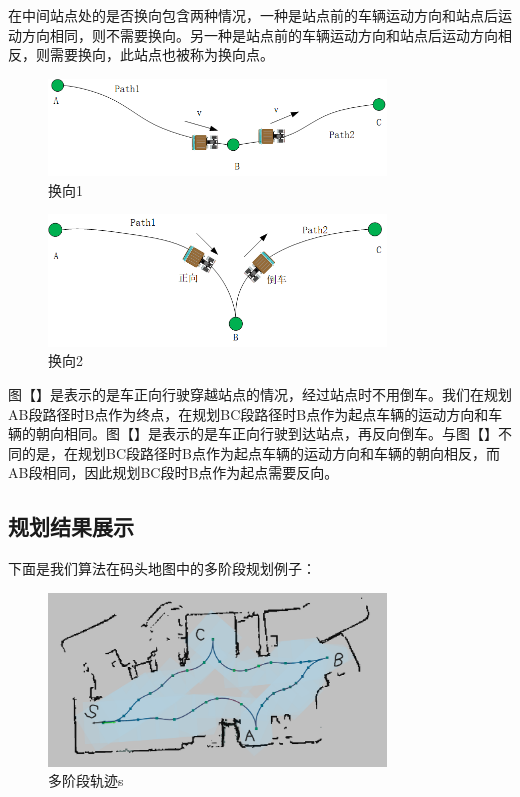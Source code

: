 \documentclass[master,academic]{ysuthesis} %
\begin{document}
		在中间站点处的是否换向包含两种情况，一种是站点前的车辆运动方向和站点后运动方向相同，则不需要换向。另一种是站点前的车辆运动方向和站点后运动方向相反，则需要换向，此站点也被称为换向点。
		\begin{figure}[!ht]
			\centering
			\includegraphics[width=0.8\textwidth]{换向1.png}
			\caption{换向1}
			\label{fig:换向1}
		\end{figure}
		\begin{figure}[!ht]
			\centering
			\includegraphics[width=0.8\textwidth]{换向2.png}
			\caption{换向2}
			\label{fig:换向2}
		\end{figure}
		图【】是表示的是车正向行驶穿越站点的情况，经过站点时不用倒车。我们在规划AB段路径时B点作为终点，在规划BC段路径时B点作为起点车辆的运动方向和车辆的朝向相同。图【】是表示的是车正向行驶到达站点，再反向倒车。与图【】不同的是，在规划BC段路径时B点作为起点车辆的运动方向和车辆的朝向相反，而AB段相同，因此规划BC段时B点作为起点需要反向。
		\subsection{规划结果展示}
		下面是我们算法在码头地图中的多阶段规划例子：
		\begin{figure}[!ht]
			\centering
			\includegraphics[width=0.8\textwidth]{多阶段轨迹s.png}
			\caption{多阶段轨迹s}
			\label{fig:多阶段轨迹s}
		\end{figure}
\end{document}
